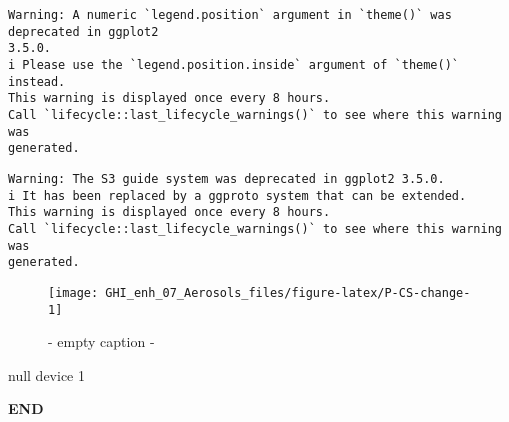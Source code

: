 \documentclass[
  10pt,
  a4paper,oneside]{article}
\begin{document}
\begin{verbatim}
Warning: A numeric `legend.position` argument in `theme()` was deprecated in ggplot2
3.5.0.
i Please use the `legend.position.inside` argument of `theme()` instead.
This warning is displayed once every 8 hours.
Call `lifecycle::last_lifecycle_warnings()` to see where this warning was
generated.
\end{verbatim}

\begin{verbatim}
Warning: The S3 guide system was deprecated in ggplot2 3.5.0.
i It has been replaced by a ggproto system that can be extended.
This warning is displayed once every 8 hours.
Call `lifecycle::last_lifecycle_warnings()` to see where this warning was
generated.
\end{verbatim}

\begin{figure}[H]

{\centering \texttt{[image: GHI\_enh\_07\_Aerosols\_files/figure-latex/P-CS-change-1]} 

}

\caption{ - empty caption - }\label{fig:P-CS-change}
\end{figure}

null device
1

\textbf{END}
\end{document}
